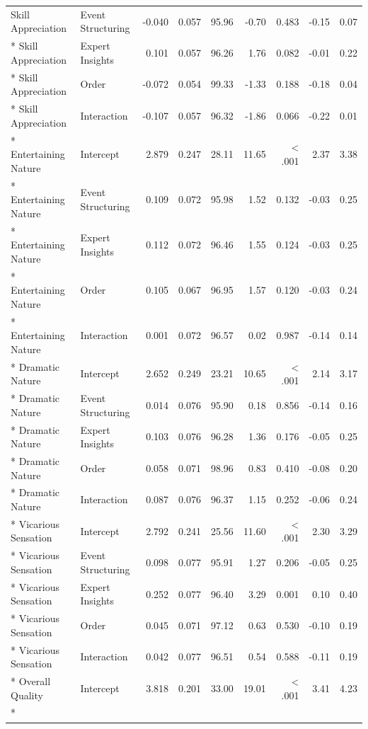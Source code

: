 \begin{longtable}{l l r r r r r r r}
Skill Appreciation & Event Structuring & -0.040 & 0.057 & 95.96 & -0.70 & 0.483 & -0.15 & 0.07\\*
Skill Appreciation & Expert Insights & 0.101 & 0.057 & 96.26 & 1.76 & 0.082 & -0.01 & 0.22\\*
Skill Appreciation & Order & -0.072 & 0.054 & 99.33 & -1.33 & 0.188 & -0.18 & 0.04\\*
Skill Appreciation & Interaction & -0.107 & 0.057 & 96.32 & -1.86 & 0.066 & -0.22 & 0.01\\*
Entertaining Nature & Intercept & 2.879 & 0.247 & 28.11 & 11.65 & < .001 & 2.37 & 3.38\\*
Entertaining Nature & Event Structuring & 0.109 & 0.072 & 95.98 & 1.52 & 0.132 & -0.03 & 0.25\\*
Entertaining Nature & Expert Insights & 0.112 & 0.072 & 96.46 & 1.55 & 0.124 & -0.03 & 0.25\\*
Entertaining Nature & Order & 0.105 & 0.067 & 96.95 & 1.57 & 0.120 & -0.03 & 0.24\\*
Entertaining Nature & Interaction & 0.001 & 0.072 & 96.57 & 0.02 & 0.987 & -0.14 & 0.14\\*
Dramatic Nature & Intercept & 2.652 & 0.249 & 23.21 & 10.65 & < .001 & 2.14 & 3.17\\*
Dramatic Nature & Event Structuring & 0.014 & 0.076 & 95.90 & 0.18 & 0.856 & -0.14 & 0.16\\*
Dramatic Nature & Expert Insights & 0.103 & 0.076 & 96.28 & 1.36 & 0.176 & -0.05 & 0.25\\*
Dramatic Nature & Order & 0.058 & 0.071 & 98.96 & 0.83 & 0.410 & -0.08 & 0.20\\*
Dramatic Nature & Interaction & 0.087 & 0.076 & 96.37 & 1.15 & 0.252 & -0.06 & 0.24\\*
Vicarious Sensation & Intercept & 2.792 & 0.241 & 25.56 & 11.60 & < .001 & 2.30 & 3.29\\*
Vicarious Sensation & Event Structuring & 0.098 & 0.077 & 95.91 & 1.27 & 0.206 & -0.05 & 0.25\\*
Vicarious Sensation & Expert Insights & 0.252 & 0.077 & 96.40 & 3.29 & 0.001 & 0.10 & 0.40\\*
Vicarious Sensation & Order & 0.045 & 0.071 & 97.12 & 0.63 & 0.530 & -0.10 & 0.19\\*
Vicarious Sensation & Interaction & 0.042 & 0.077 & 96.51 & 0.54 & 0.588 & -0.11 & 0.19\\*
Overall Quality & Intercept & 3.818 & 0.201 & 33.00 & 19.01 & < .001 & 3.41 & 4.23\\*

\end{longtable}
